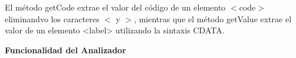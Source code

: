 El método getCode extrae el valor del código de un elemento $<$code$>$ eliminandvo los caracteres $<$ y $>$, mientras que el método getValue extrae el valor de un elemento <label> utilizando la sintaxis CDATA.

\phantom{text}

\noindent \textbf{Funcionalidad del Analizador}

\phantom{text}






